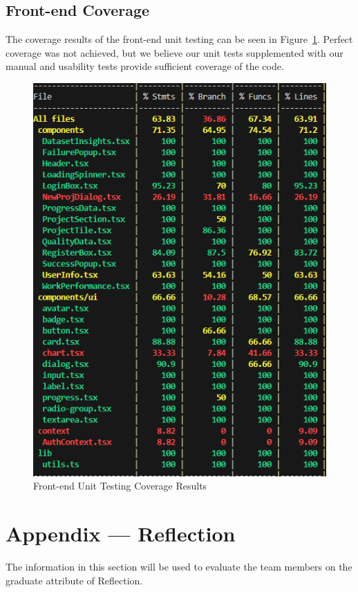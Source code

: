\documentclass[12pt, titlepage]{article}
\begin{document}
\subsection{Front-end Coverage}
The coverage results of the front-end unit testing can be seen in Figure~\ref{fig:FE_coverage}. Perfect coverage was not achieved, but we believe our unit tests supplemented with our manual and usability tests provide sufficient coverage of the code.
\begin{figure}[H]
    \centering
    \includegraphics[width=0.5\linewidth]{FE_coverage.png}
    \caption{Front-end Unit Testing Coverage Results}
    \label{fig:FE_coverage}
\end{figure}




\newpage{}
\section*{Appendix --- Reflection}

The information in this section will be used to evaluate the team members on the
graduate attribute of Reflection.


\end{document}
